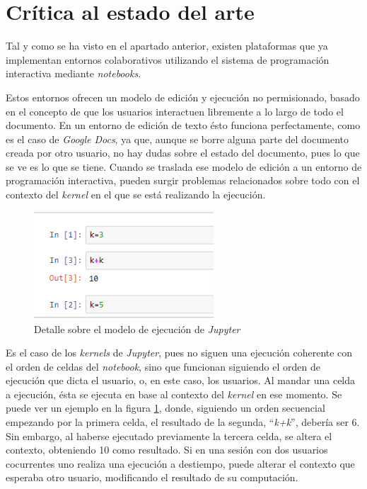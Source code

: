 \documentclass[11pt,spanish,listoffigures]{tfgetsinf}
\begin{document}

\section{Crítica al estado del arte}
\label{sec:critica-estado}

Tal y como se ha visto en el apartado anterior, existen plataformas que ya implementan entornos colaborativos utilizando el sistema de programación interactiva mediante \textit{notebooks}. 

Estos entornos ofrecen un modelo de edición y ejecución no permisionado, basado en el concepto de que los usuarios interactuen libremente a lo largo de todo el documento. En un entorno de edición de texto ésto funciona perfectamente, como es el caso de \textit{Google Docs}, ya que, aunque se borre alguna parte del documento creada por otro usuario, no hay dudas sobre el estado del documento, pues lo que se ve es lo que se tiene. Cuando se traslada ese modelo de edición a un entorno de programación interactiva, pueden surgir problemas relacionados sobre todo con el contexto del \textit{kernel} en el que se está realizando la ejecución.

\begin{figure}[h]
  \centering
  \includegraphics[width=0.6\textwidth]{exec-jupy.png}
  \caption{Detalle sobre el modelo de ejecución de \textit{Jupyter}}
  \label{fig:ex-jup}
\end{figure}

Es el caso de los \textit{kernels} de \textit{Jupyter}, pues no siguen una ejecución coherente con el orden de celdas del \textit{notebook}, sino que funcionan siguiendo el orden de ejecución que dicta el usuario, o, en este caso, los usuarios. Al mandar una celda a ejecución, ésta se ejecuta en base al contexto del \textit{kernel} en ese momento. Se puede ver un ejemplo en la figura \ref{fig:ex-jup}, donde, siguiendo un orden secuencial empezando por la primera celda, el resultado de la segunda, ``\textit{k+k}'', debería ser 6. Sin embargo, al haberse ejecutado previamente la tercera celda, se altera el contexto, obteniendo 10 como resultado. Si en una sesión con dos usuarios cocurrentes uno realiza una ejecución a destiempo, puede alterar el contexto que esperaba otro usuario, modificando el resultado de su computación. 
\end{document}
